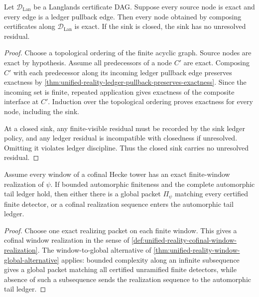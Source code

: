\begin{theorem}
\label{thm:unified-reality-langlands-certificate-dag-induction}
Let $\mathcal D_{\mathrm{Lan}}$ be a Langlands certificate DAG. Suppose
every source node is exact and every edge is a ledger pullback edge.
Then every node obtained by composing certificates along
$\mathcal D_{\mathrm{Lan}}$ is exact. If the sink is closed, the sink
has no unresolved residual.
\end{theorem}
\begin{proof}
Choose a topological ordering of the finite acyclic graph. Source nodes
are exact by hypothesis. Assume all predecessors of a node $C'$ are
exact. Composing $C'$ with each predecessor along its incoming ledger
pullback edge preserves exactness by
\autoref{thm:unified-reality-ledger-pullback-preserves-exactness}.
Since the incoming set is finite, repeated application gives exactness
of the composite interface at $C'$. Induction over the topological
ordering proves exactness for every node, including the sink.

At a closed sink, any finite-visible residual must be recorded by the
sink ledger policy, and any ledger residual is incompatible with
closedness if unresolved. Omitting it violates ledger discipline. Thus
the closed sink carries no unresolved residual.
\end{proof}

\begin{theorem}
\label{thm:unified-reality-cofinal-exactness-dichotomy}
Assume every window of a cofinal Hecke tower has an exact
finite-window realization of $\psi$. If bounded automorphic finiteness
and the complete automorphic tail ledger hold, then either there is a
global packet $\Pi_\psi$ matching every certified finite detector, or a
cofinal realization sequence enters the automorphic tail ledger.
\end{theorem}
\begin{proof}
Choose one exact realizing packet on each finite window. This gives a
cofinal window realization in the sense of
\autoref{def:unified-reality-cofinal-window-realization}. The
window-to-global alternative of
\autoref{thm:unified-reality-window-global-alternative} applies:
bounded complexity along an infinite subsequence gives a global packet
matching all certified unramified finite detectors, while absence of
such a subsequence sends the realization sequence to the automorphic
tail ledger.
\end{proof}

